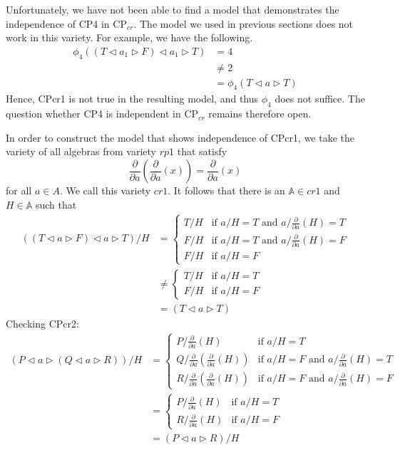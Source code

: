 \documentclass[a4paper,twoside,openright]{report}
\newcommand{\dd}[1]{\frac{\partial}{\partial #1}}
\newcommand{\lef}{\ensuremath{\triangleleft}}
\newcommand{\rig}{\ensuremath{\triangleright}}
\begin{document}
Unfortunately, we have not been able to find a model that demonstrates the independence of CP4 in $\text{CP}_{cr}$. The model we used in previous sections does not work in this variety. For example, we have the following.
\begin{align*}
\phi_4((T\lef a_1\rig F)\lef a_1\rig T)
&= 4\\
&\ne 2\\
&=\phi_4(T\lef a\rig T)
\end{align*}
Hence, CPcr1 is not true in the resulting model, and thus $\phi_4$ does not suffice. The question whether CP4 is independent in $\text{CP}_{cr}$ remains therefore open.

In order to construct the model that shows independence of CPcr1, we take the variety of all algebras from variety $rp1$ that satisfy
\[
\dd a(\dd a(x)) =\dd a(x)
\]
for all $a\in A$. We call this variety $cr1$. It follows that there is an $\mathbb{A}\in cr1$ and $H\in\mathbb{A}$ such that 
\begin{align*}
((T\lef a\rig F)\lef a\rig T)/H
&=\begin{cases}
T/H & \text{if $a/H=T$ and $a/\dd a(H)=T$}\\
F/H & \text{if $a/H=T$ and $a/\dd a(H)=F$}\\
F/H & \text{if $a/H=F$}
\end{cases}\\
&\ne\begin{cases}
T/H & \text{if $a/H=T$}\\
F/H & \text{if $a/H=F$}
\end{cases}\\
&=(T\lef a\rig T)
\end{align*}
Checking CPcr2:
\begin{align*}
(P\lef a\rig(Q\lef a\rig R))/H
&=\begin{cases}
P/\dd a(H) & \text{if $a/H=T$}\\
Q/\dd a(\dd a(H)) & \text{if $a/H=F$ and $a/\dd a(H)=T$}\\
R/\dd a(\dd a(H)) & \text{if $a/H=F$ and $a/\dd a(H)=F$}
\end{cases}\\
&=\begin{cases}
P/\dd a(H) & \text{if $a/H=T$}\\
R/\dd a(H) & \text{if $a/H=F$}
\end{cases}\\
&=(P\lef a\rig R)/H
\end{align*}
\end{document}
